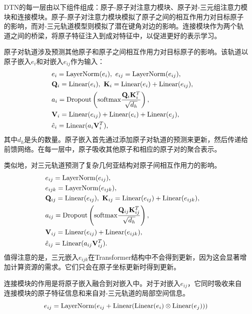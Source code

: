 DTN的每一层由以下组件组成：原子-原子对注意力模块、原子对-三元组注意力模块和连接模块。原子-原子对注意力模块模拟了原子之间的相互作用力对目标原子的影响，而对-三元轨道模型则模拟了潜在键角对边的影响。连接模块作为两个轨道之间的桥梁，将原子特征注入到成对特征中，以促进更好的表示学习。

原子对轨道涉及预测其他原子和原子之间相互作用力对目标原子的影响。该轨道以原子嵌入$e_i$和对嵌入$e_{ij}$作为输入：
\begin{eqnarray}
    &e_i = {\rm LayerNorm}(e_i), \ e_{ij} = {\rm LayerNorm}(e_{ij}),& \\
    &\mathbf{Q}_i = {\rm Linear}(e_i), \ \mathbf{K}_i = {\rm Linear}(e_i) + {\rm Linear}(e_{ij}),& \\
    &a_i = {\rm Dropout} \left({\rm softmax} \frac{\mathbf{Q}_i \mathbf{K}_i^T}{\sqrt{d_h}} \right), & \\
    &\mathbf{V}_i = {\rm Linear}(e_{ij}) + {\rm Linear}(e_{i}) + {\rm Linear}(e_{j}),& \\
    &\hat{e}_i = {\rm Linear}(a_i \mathbf{V}_i^T),&
\end{eqnarray}
其中$d_h$是头的数量。原子嵌入首先通过添加原子对轨道的预测来更新，然后传递给前馈网络。在每一层中，原子吸收其他原子和相应的原子对的聚合表示。

类似地，对三元轨道预测了复杂几何亚结构对原子间相互作用力的影响。
\begin{eqnarray}
    &e_{ij} = {\rm LayerNorm}(e_{ij}),&\\
    &e_{ijk} = {\rm LayerNorm}(e_{ijk}),&\\
    &\mathbf{Q}_{ij} = {\rm Linear}(e_{ij}), \ \mathbf{K}_{ij} = {\rm Linear}(e_{ij}) + {\rm Linear}(e_{ijk}),& \\
    &a_{ij}= {\rm Dropout} \left({\rm softmax} \frac{\mathbf{Q}_{ij} \mathbf{K}_{ij}^T}{\sqrt{d_h}} \right), & \\
    &\mathbf{V}_{ij} = {\rm Linear}(e_{ij}) + {\rm Linear}(e_{ijk}),& \\
    &\hat{e}_{ij} = {\rm Linear}(a_{ij} \mathbf{V}_{ij}^T).&
\end{eqnarray}
值得注意的是，三元嵌入$e_{ijk}$在Transformer结构中不会得到更新，因为这会显著增加计算资源的需求。它们只会在原子坐标更新时得到更新。

连接模块的作用是将原子嵌入融合到对嵌入中。对于对嵌入$e_{ij}$，它同时吸收来自连接模块的原子特征信息和来自对-三元轨道的局部空间信息。
\begin{equation}
    e_{ij} = {\rm LayerNorm}(e_{ij} + {\rm Linear}({\rm Linear}(e_i) \otimes {\rm Linear}(e_j)))
\end{equation}

